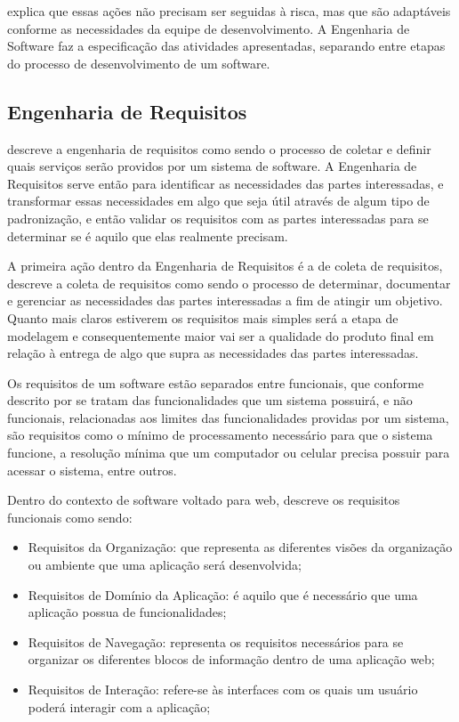 \cite{pressman2009engenharia} explica que essas ações não precisam ser seguidas à risca, mas que são adaptáveis conforme as necessidades da equipe de desenvolvimento. A Engenharia de Software faz a especificação das atividades apresentadas, separando entre etapas do processo de desenvolvimento de um software.

\subsection{Engenharia de Requisitos}

\cite{elgabry2016requirements} descreve a engenharia de requisitos como sendo o processo de coletar e definir quais serviços serão providos por um sistema de software. A Engenharia de Requisitos serve então para identificar as necessidades das partes interessadas, e transformar essas necessidades em algo que seja útil através de algum tipo de padronização, e então validar os requisitos com as partes interessadas para se determinar se é aquilo que elas realmente precisam.

A primeira ação dentro da Engenharia de Requisitos é a de coleta de requisitos, \cite{pmbok2017} descreve a coleta de requisitos como sendo o processo de determinar, documentar e gerenciar as necessidades das partes interessadas a fim de atingir um objetivo. Quanto mais claros estiverem os requisitos mais simples será a etapa de modelagem e consequentemente maior vai ser a qualidade do produto final em relação à entrega de algo que supra as necessidades das partes interessadas.

Os requisitos de um software estão separados entre funcionais, que conforme descrito por \cite{elgabry2016requirements} se tratam das funcionalidades que um sistema possuirá, e não funcionais, relacionadas aos limites das funcionalidades providas por um sistema, são requisitos como o mínimo de processamento necessário para que o sistema funcione, a resolução mínima que um computador ou celular precisa possuir para acessar o sistema, entre outros.


Dentro do contexto de software voltado para web, \cite{casteleyn2009engineering} descreve os requisitos funcionais como sendo:

\begin{itemize}
    \item Requisitos da Organização: que representa as diferentes visões da organização ou ambiente que uma aplicação será desenvolvida;
    \item Requisitos de Domínio da Aplicação: é aquilo que é necessário que uma aplicação possua de funcionalidades;
    \item Requisitos de Navegação: representa os requisitos necessários para se organizar os diferentes blocos de informação dentro de uma aplicação web;
    \item Requisitos de Interação: refere-se às interfaces com os quais um usuário poderá interagir com a aplicação;
\end{itemize}
	
